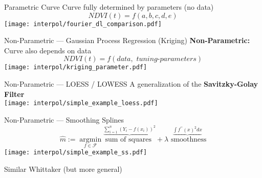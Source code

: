 
\begin{frame}[fragile]{Parametric Curve}
    Curve fully determined by parameters (no data)
    $$
        NDVI(t) = f(a,b,c,d,e)
    $$
    \texttt{[image: interpol/fourier\_dl\_comparison.pdf]}
\end{frame}




%     


\begin{frame}{Non-Parametric --- Gaussian Process Regression (Kriging)}
    \textbf{Non-Parametric:} Curve also depends on data
    \large
    $$
        NDVI(t) = f(\textit{data}, \textit{ tuning-parameters})
    $$
    \texttt{[image: interpol/kriging\_parameter.pdf]}
\end{frame}

\begin{frame}{Non-Parametric --- LOESS / LOWESS}
    A generalization of the \textbf{Savitzky-Golay Filter} \\
    \color{mygray}{(allows for non-equidistant points and interpolation)}
    \centering
    \texttt{[image: interpol/simple\_example\_loess.pdf]}
\end{frame}


\begin{frame}{Non-Parametric --- Smoothing Splines}
    $$\hat m :=\underset{f \in \mathcal F}{\operatorname{argmin}}
        \overset{\underbrace{\sum_{i=1}^{n}\left(Y_{i}-{f}\left(x_{i}\right)\right)^{2}}}{\text{sum of squares }}
        + \lambda \overset{\underbrace{\int {f}^{\prime \prime}(x)^{2} d x}}{\text{ smoothness}}$$
    \centering
    \texttt{[image: interpol/simple\_example\_ss.pdf]}

    Similar Whittaker (but more general)
\end{frame}


